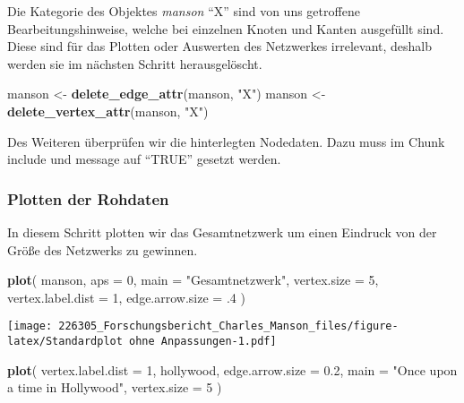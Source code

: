 \documentclass[
]{article}
\newenvironment{Shaded}{\begin{snugshade}}{\end{snugshade}}
\newcommand{\DataTypeTok}[1]{\textcolor[rgb]{0.13,0.29,0.53}{#1}}
\newcommand{\DecValTok}[1]{\textcolor[rgb]{0.00,0.00,0.81}{#1}}
\newcommand{\FloatTok}[1]{\textcolor[rgb]{0.00,0.00,0.81}{#1}}
\newcommand{\KeywordTok}[1]{\textcolor[rgb]{0.13,0.29,0.53}{\textbf{#1}}}
\newcommand{\NormalTok}[1]{#1}
\newcommand{\StringTok}[1]{\textcolor[rgb]{0.31,0.60,0.02}{#1}}
\begin{document}
Die Kategorie des Objektes \emph{manson} ``X'' sind von uns getroffene
Bearbeitungshinweise, welche bei einzelnen Knoten und Kanten ausgefüllt
sind. Diese sind für das Plotten oder Auswerten des Netzwerkes
irrelevant, deshalb werden sie im nächsten Schritt herausgelöscht.

\begin{Shaded}
\begin{Highlighting}[]
\NormalTok{manson <-}\StringTok{ }\KeywordTok{delete_edge_attr}\NormalTok{(manson, }\StringTok{"X"}\NormalTok{)}
\NormalTok{manson <-}\StringTok{ }\KeywordTok{delete_vertex_attr}\NormalTok{(manson, }\StringTok{"X"}\NormalTok{)}
\end{Highlighting}
\end{Shaded}

Des Weiteren überprüfen wir die hinterlegten Nodedaten. Dazu muss im
Chunk include und message auf ``TRUE'' gesetzt werden.

\hypertarget{plotten-der-rohdaten}{%
\subsubsection{Plotten der Rohdaten}\label{plotten-der-rohdaten}}

In diesem Schritt plotten wir das Gesamtnetzwerk um einen Eindruck von
der Größe des Netzwerks zu gewinnen.

\begin{Shaded}
\begin{Highlighting}[]
\KeywordTok{plot}\NormalTok{(}
\NormalTok{  manson,}
  \DataTypeTok{aps =} \DecValTok{0}\NormalTok{,}
  \DataTypeTok{main =} \StringTok{"Gesamtnetzwerk"}\NormalTok{,}
  \DataTypeTok{vertex.size =} \DecValTok{5}\NormalTok{,}
  \DataTypeTok{vertex.label.dist =} \DecValTok{1}\NormalTok{,}
  \DataTypeTok{edge.arrow.size =} \FloatTok{.4}
\NormalTok{)}
\end{Highlighting}
\end{Shaded}

\texttt{[image: 226305\_Forschungsbericht\_Charles\_Manson\_files/figure-latex/Standardplot ohne Anpassungen-1.pdf]}

\begin{Shaded}
\begin{Highlighting}[]
\KeywordTok{plot}\NormalTok{(}
  \DataTypeTok{vertex.label.dist =} \DecValTok{1}\NormalTok{,}
\NormalTok{  hollywood,}
  \DataTypeTok{edge.arrow.size =} \FloatTok{0.2}\NormalTok{,}
  \DataTypeTok{main =} \StringTok{"Once upon a time in Hollywood"}\NormalTok{,}
  \DataTypeTok{vertex.size =} \DecValTok{5}
\NormalTok{)}
\end{Highlighting}
\end{Shaded}
\end{document}

